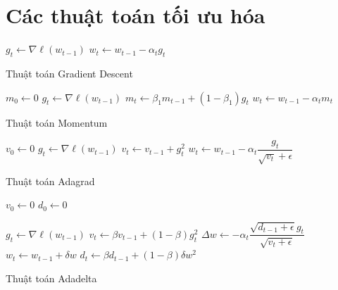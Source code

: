 \documentclass[14pt, a4paper]{article}
\theoremstyle{sltheorem}
\theoremstyle{soltheorem}
\begin{document}
\newpage
\printbibliography[title={TÀI LIỆU THAM KHẢO}]

\newpage
\appendix

\section{Các thuật toán tối ưu hóa}


\begin{algorithm}[h!]
    \DontPrintSemicolon

     {
        $g_t \gets \nabla \ell(w_{t-1})$\;
        $w_t \gets w_{t-1} - \alpha_t g_t$
    }
    \;
    \caption{Thuật toán Gradient Descent}
\end{algorithm}


\begin{algorithm}[h!]
    \DontPrintSemicolon
    $m_0 \gets 0$\;
     {
        $g_t \gets \nabla \ell(w_{t-1})$\;
        $m_t \gets \beta_1 m_{t-1} + (1-\beta_1) g_t$\;
        $w_t \gets w_{t-1} - \alpha_t m_t$\;
    }
    \;
    \caption{Thuật toán Momentum}
\end{algorithm}


\begin{algorithm}[h!]

    $v_0 \gets 0$\;
     {
        $g_t \gets \nabla \ell(w_{t-1})$\;
        $v_t \gets v_{t-1} + g_t^2$\;
        $w_t \gets w_{t-1} - \alpha_t \dfrac{g_t}{\sqrt{v_t} + \epsilon}$\;
    }

    \;
    \caption{Thuật toán Adagrad}
\end{algorithm}

\begin{algorithm}[h!]
    \DontPrintSemicolon

    $v_0 \gets 0$\;
    $d_0 \gets 0$\;

     {
        $g_t \gets \nabla \ell (w_{t-1})$\;
        $v_t \gets \beta v_{t-1} + (1-\beta) g_t^2$\;
        $\Delta w \gets -\alpha_t \dfrac{\sqrt{d_{t-1} + \epsilon}g_t}{\sqrt{v_t + \epsilon}}$\;
        $w_t \gets w_{t-1} + \delta w$\;
        $d_t \gets \beta d_{t-1} + (1-\beta) \delta w^2$\;
    }

    \;
    \caption{Thuật toán Adadelta}
\end{algorithm}
\end{document}
